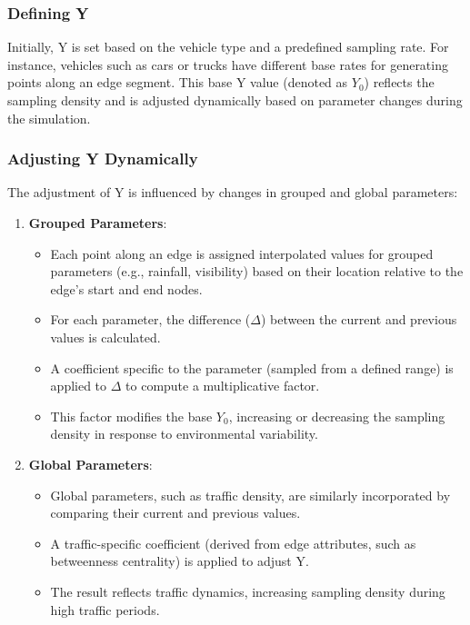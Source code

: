 \documentclass[a4paper,UKenglish,cleveref, autoref, thm-restate]{lipics-v2021}
\begin{document}
\subsubsection{Defining Y}
Initially, Y is set based on the vehicle type and a predefined sampling rate. For instance, vehicles such as cars or trucks have different base rates for generating points along an edge segment. This base Y value (denoted as $Y_0$) reflects the sampling density and is adjusted dynamically based on parameter changes during the simulation.

\subsubsection{Adjusting Y Dynamically}
The adjustment of Y is influenced by changes in grouped and global parameters:

\begin{enumerate}
    \item \textbf{Grouped Parameters}:
    \begin{itemize}
        \item Each point along an edge is assigned interpolated values for grouped parameters (e.g., rainfall, visibility) based on their location relative to the edge's start and end nodes.
        \item For each parameter, the difference ($\Delta$) between the current and previous values is calculated.
        \item A coefficient specific to the parameter (sampled from a defined range) is applied to $\Delta$ to compute a multiplicative factor.
        \item This factor modifies the base $Y_0$, increasing or decreasing the sampling density in response to environmental variability.
    \end{itemize}

    \item \textbf{Global Parameters}:
    \begin{itemize}
        \item Global parameters, such as traffic density, are similarly incorporated by comparing their current and previous values.
        \item A traffic-specific coefficient (derived from edge attributes, such as betweenness centrality) is applied to adjust Y.
        \item The result reflects traffic dynamics, increasing sampling density during high traffic periods.
    \end{itemize}
\end{enumerate}
\end{document}
